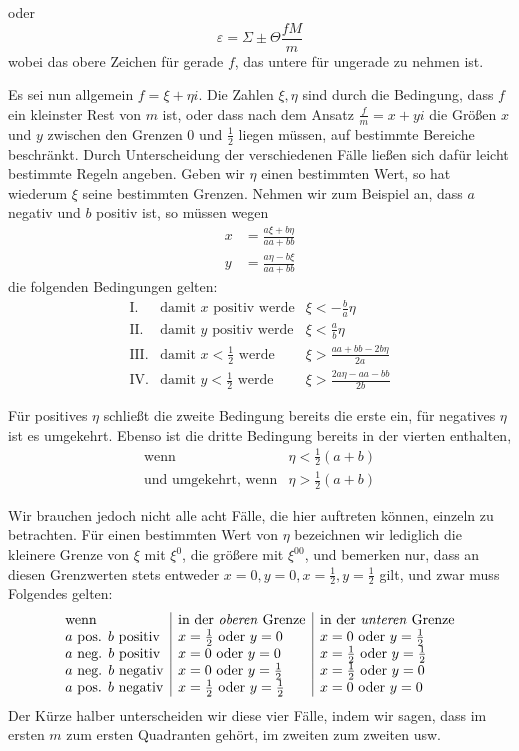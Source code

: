 oder
\[
\varepsilon=\Sigma\pm\Theta\frac{fM}{m}
\]
wobei das obere Zeichen für gerade $f$, das untere für ungerade zu nehmen ist.

Es sei nun allgemein $f=\xi+\eta i$. Die Zahlen $\xi,\eta$ sind durch die Bedingung, dass $f$ ein kleinster Rest von $m$ ist, oder dass nach dem Ansatz $\frac{f}{m}=x+yi$ die Größen $x$ und $y$ zwischen den Grenzen $0$ und $\frac12$ liegen müssen, auf bestimmte Bereiche beschränkt. Durch Unterscheidung der verschiedenen Fälle ließen sich dafür leicht bestimmte Regeln angeben. Geben wir $\eta$ einen bestimmten Wert, so hat wiederum $\xi$ seine bestimmten Grenzen. Nehmen wir zum Beispiel an, dass $a$ negativ und $b$ positiv ist, so müssen wegen
\[
\begin{aligned}
x&=\frac{a\xi+b\eta}{aa+bb}\\
y&=\frac{a\eta-b\xi}{aa+bb}
\end{aligned}
\]
die folgenden Bedingungen gelten:
\[
\begin{array}{rll}
\mathrm{I.}&\text{damit }x\text{ positiv werde}&\xi<-\frac{b}{a}\eta\\[3pt]
\mathrm{II.}&\text{damit }y\text{ positiv werde}&\xi<\frac{a}{b}\eta\\[3pt]
\mathrm{III.}&\text{damit }x<\frac12\text{ werde}&\xi>\frac{aa+bb-2b\eta}{2a}\\[3pt]
\mathrm{IV.}&\text{damit }y<\frac12\text{ werde}&\xi>\frac{2a\eta-aa-bb}{2b}
\end{array}
\]

Für positives $\eta$ schließt die zweite Bedingung bereits die erste ein, für negatives $\eta$ ist es umgekehrt. Ebenso ist die dritte Bedingung bereits in der vierten enthalten,
\[
\begin{array}{ll}
\text{wenn}&\eta<\tfrac12(a+b)\\
\text{und umgekehrt, wenn}&\eta>\tfrac12(a+b)
\end{array}
\]

Wir brauchen jedoch nicht alle acht Fälle, die hier auftreten können, einzeln zu betrachten. Für einen bestimmten Wert von $\eta$ bezeichnen wir lediglich die kleinere Grenze von $\xi$ mit $\xi^0$, die größere mit $\xi^{00}$, und bemerken nur, dass an diesen Grenzwerten stets entweder $x=0,y=0,x=\frac12,y=\frac12$ gilt, und zwar muss Folgendes gelten:
\[
\begin{array}{l|l|l}
\text{wenn}&\text{in der \emph{oberen} Grenze}&\text{in der \emph{unteren} Grenze}\\
a\text{ pos. }b\text{ positiv}&x=\frac12\text{ oder }y=0&x=0\text{ oder }y=\frac12\\
a\text{ neg. }b\text{ positiv}&x=0\text{ oder }y=0&x=\frac12\text{ oder }y=\frac12\\
a\text{ neg. }b\text{ negativ}&x=0\text{ oder }y=\frac12&x=\frac12\text{ oder }y=0\\
a\text{ pos. }b\text{ negativ}&x=\frac12\text{ oder }y=\frac12&x=0\text{ oder }y=0
\end{array}
\]
Der Kürze halber unterscheiden wir diese vier Fälle, indem wir sagen, dass im ersten $m$ zum ersten Quadranten gehört, im zweiten zum zweiten usw.

